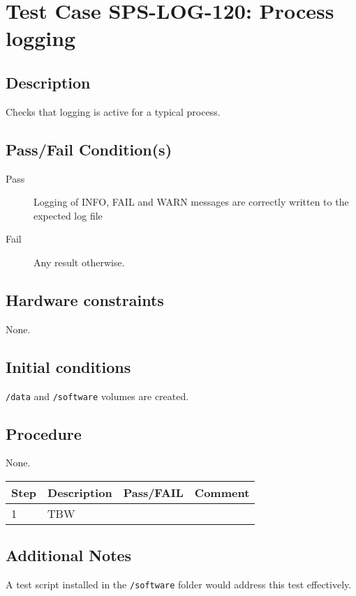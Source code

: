 \section{Test Case SPS-LOG-120: Process logging}

\subsection{Description}

Checks that logging is active for a typical process.

\subsection{Pass/Fail Condition(s)}

\begin{description}
\item [Pass] Logging of INFO, FAIL and WARN messages are correctly written to the expected log file
\item [Fail] Any result otherwise.
\end{description}

\subsection{Hardware constraints}

None.

\subsection{Initial conditions}

\texttt{/data} and \texttt{/software} volumes are created.

\subsection{Procedure}

None.

\begin{table}[H]
    \begin{tabular}{|l| p{5cm} |l| p{5cm} |}
    \hline
    {\bf Step} & {\bf Description} & {\bf Pass/FAIL} & {\bf Comment}  \\ \hline
    1 & TBW &  &  \\ \hline
    \end{tabular}
\end{table}

\subsection{Additional Notes}

A test script installed in the \texttt{/software} folder would address this test effectively.